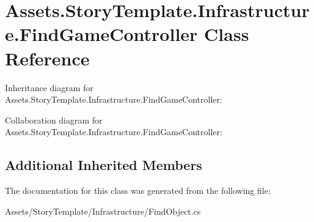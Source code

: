 \hypertarget{classAssets_1_1StoryTemplate_1_1Infrastructure_1_1FindGameController}{}\section{Assets.\+Story\+Template.\+Infrastructure.\+Find\+Game\+Controller Class Reference}
\label{classAssets_1_1StoryTemplate_1_1Infrastructure_1_1FindGameController}


Inheritance diagram for Assets.\+Story\+Template.\+Infrastructure.\+Find\+Game\+Controller\+:


Collaboration diagram for Assets.\+Story\+Template.\+Infrastructure.\+Find\+Game\+Controller\+:
\subsection*{Additional Inherited Members}


The documentation for this class was generated from the following file\+:\begin{DoxyCompactItemize}
\item 
Assets/\+Story\+Template/\+Infrastructure/Find\+Object.\+cs\end{DoxyCompactItemize}
